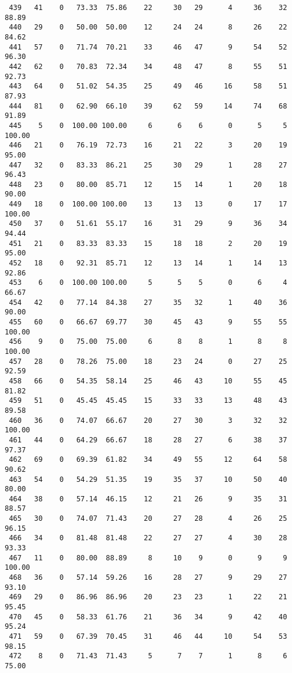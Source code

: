 \begin{verbatim}
 439   41    0   73.33  75.86    22     30   29      4     36    32    88.89
 440   29    0   50.00  50.00    12     24   24      8     26    22    84.62
 441   57    0   71.74  70.21    33     46   47      9     54    52    96.30
 442   62    0   70.83  72.34    34     48   47      8     55    51    92.73
 443   64    0   51.02  54.35    25     49   46     16     58    51    87.93
 444   81    0   62.90  66.10    39     62   59     14     74    68    91.89
 445    5    0  100.00 100.00     6      6    6      0      5     5   100.00
 446   21    0   76.19  72.73    16     21   22      3     20    19    95.00
 447   32    0   83.33  86.21    25     30   29      1     28    27    96.43
 448   23    0   80.00  85.71    12     15   14      1     20    18    90.00
 449   18    0  100.00 100.00    13     13   13      0     17    17   100.00
 450   37    0   51.61  55.17    16     31   29      9     36    34    94.44
 451   21    0   83.33  83.33    15     18   18      2     20    19    95.00
 452   18    0   92.31  85.71    12     13   14      1     14    13    92.86
 453    6    0  100.00 100.00     5      5    5      0      6     4    66.67
 454   42    0   77.14  84.38    27     35   32      1     40    36    90.00
 455   60    0   66.67  69.77    30     45   43      9     55    55   100.00
 456    9    0   75.00  75.00     6      8    8      1      8     8   100.00
 457   28    0   78.26  75.00    18     23   24      0     27    25    92.59
 458   66    0   54.35  58.14    25     46   43     10     55    45    81.82
 459   51    0   45.45  45.45    15     33   33     13     48    43    89.58
 460   36    0   74.07  66.67    20     27   30      3     32    32   100.00
 461   44    0   64.29  66.67    18     28   27      6     38    37    97.37
 462   69    0   69.39  61.82    34     49   55     12     64    58    90.62
 463   54    0   54.29  51.35    19     35   37     10     50    40    80.00
 464   38    0   57.14  46.15    12     21   26      9     35    31    88.57
 465   30    0   74.07  71.43    20     27   28      4     26    25    96.15
 466   34    0   81.48  81.48    22     27   27      4     30    28    93.33
 467   11    0   80.00  88.89     8     10    9      0      9     9   100.00
 468   36    0   57.14  59.26    16     28   27      9     29    27    93.10
 469   29    0   86.96  86.96    20     23   23      1     22    21    95.45
 470   45    0   58.33  61.76    21     36   34      9     42    40    95.24
 471   59    0   67.39  70.45    31     46   44     10     54    53    98.15
 472    8    0   71.43  71.43     5      7    7      1      8     6    75.00

\end{verbatim}
